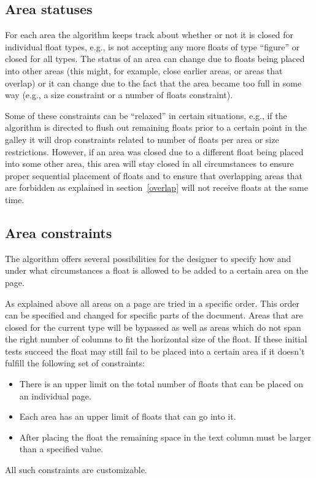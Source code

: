 \documentclass[twocolumn]{article}
\begin{document}
\subsection{Area statuses}

For each area the algorithm keeps track about whether or not it is
closed for individual float types, e.g., is not accepting any more
floats of type ``figure'' or closed for all types. The status of an
area can change due to floats being placed into other areas (this
might, for example, close earlier areas, or areas that overlap) or it
can change due to the fact that the area became too full in some way
(e.g., a size constraint or a number of floats constraint).

Some of these constraints can be ``relaxed'' in certain situations,
e.g., if the algorithm is directed to flush out remaining floats prior
to a certain point in the galley it will drop constraints related to
number of floats per area or size restrictions. However, if an area
was closed due to a different float being placed into some other area,
this area will stay closed in all circumstances to ensure proper
sequential placement of floats and to ensure that overlapping areas
that are forbidden as explained in section~\vref{overlap} will not
receive floats at the same time.




\subsection{Area constraints}

The algorithm offers several possibilities for the designer to
specify how and under what circumstances a float is allowed to be
added to a certain area on the page.

As explained above all areas on a page are tried in a specific
order. This order can be specified and changed for specific parts of
the document. Areas that are closed for the current type will be
bypassed as well as areas which do not span the right number of
columns to fit the horizontal size of the float. If these initial
tests succeed the float may still fail to be placed into a certain
area if it doesn't fulfill the following set of constraints:
\begin{itemize}
\item There is an upper limit on the total number of floats that can
be placed on an individual page.
\item Each area has an upper limit of floats that can go into it.
\item After placing the float the remaining space in the text column
must be larger than a specified value.
\end{itemize}
All such constraints are customizable.
\end{document}
